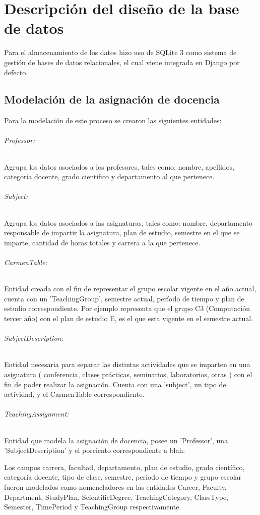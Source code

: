 \chapter{Descripción del diseño de la base de datos}\label{chapter:database}
Para el almacenamiento de los datos hizo uso de SQLite 3
como sistema de gestión de bases de datos relacionales,
el cual viene integrada en Django por defecto.

\section{Modelación de la asignación de docencia}
Para la modelación de este proceso se crearon las 
siguientes entidades:

\subparagraph{Professor:}
Agrupa los datos asociados a los profesores, 
tales como: nombre, apellidos, categoría docente, grado 
científico y departamento al que pertenece.

\subparagraph{Subject:}
Agrupa los datos asociados a las asignaturas,
tales como: nombre, departamento responsable de impartir
la asignatura, plan de estudio, semestre en el que se 
imparte, cantidad de horas totales y carrera a la que 
pertenece.

\subparagraph{CarmenTable:}
Entidad creada con el fin de representar
el grupo escolar vigente en el año actual, cuenta con un
'TeachingGroup', semestre actual, período de tiempo y 
plan de estudio correspondiente. Por ejemplo representa 
que el grupo C3 (Computación tercer año) con el plan de 
estudio E, es el que esta vigente en el semestre actual.

\subparagraph{SubjectDescription:}
Entidad necesaria para separar las distintas actividades 
que se imparten en una asignatura ( conferencia, clases 
prácticas, seminarios, laboratorios, otras ) con el fin 
de poder realizar la asignación. Cuenta con una 'subject',
un tipo de actividad, y el CarmenTable correspondiente.


\subparagraph{TeachingAssignment:}
Entidad que modela la asignación de docencia, posee un
'Professor', una 'SubjectDescription' y
el porciento correspondiente a blah.

Los campos carrera, facultad, departamento, plan de 
estudio, grado científico, categoría docente, tipo de 
clase, semestre, período de tiempo y grupo escolar fueron
modelados como nomencladores en las entidades Career,
Faculty, Department, StudyPlan, ScientificDegree, 
TeachingCategory, ClassType, Semester, TimePeriod y 
TeachingGroup respectivamente.


